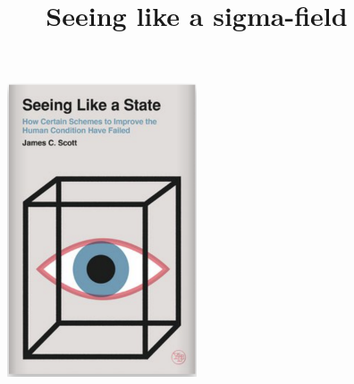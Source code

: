\documentclass[10pt]{beamer}
\title{Seeing like a sigma-field}
\begin{document}
\maketitle

\begin{frame}
\begin{figure}[H]
\centering
\includegraphics[width=0.5\textwidth]{images/seeing_like_a_state}
\end{figure}

\end{frame}
\end{document}
